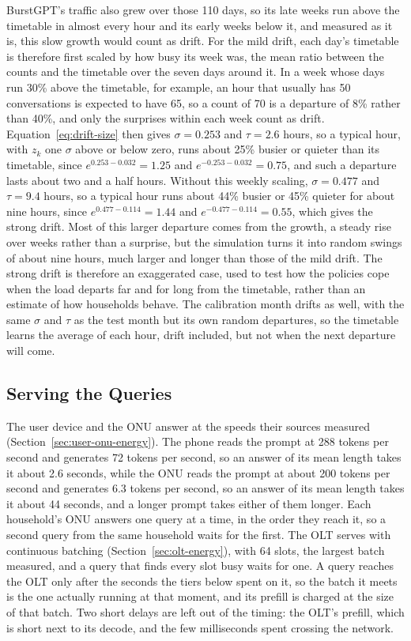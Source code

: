 \documentclass[cic,dipl,english]{infufrgs}
\begin{document}
BurstGPT's traffic also grew over those 110 days, so its late weeks run above the timetable
in almost every hour and its early weeks below it, and measured as it is, this slow growth
would count as drift. For the mild drift, each day's timetable is therefore first scaled by
how busy its week was, the mean ratio between the counts and the timetable over the seven
days around it. In a week whose days run 30\% above the timetable, for example, an hour that
usually has 50 conversations is expected to have 65, so a count of 70 is a departure of 8\%
rather than 40\%, and only the surprises within each week count as drift.
Equation~\eqref{eq:drift-size} then gives $\sigma = 0.253$ and $\tau = 2.6$ hours, so a typical hour, with $z_k$
one $\sigma$ above or below zero, runs about 25\% busier or quieter than its timetable, since
$e^{0.253 - 0.032} = 1.25$ and $e^{-0.253 - 0.032} = 0.75$, and such a departure lasts about
two and a half hours. Without this weekly scaling, $\sigma = 0.477$ and $\tau = 9.4$ hours, so a
typical hour runs about 44\% busier or 45\% quieter for about nine hours, since
$e^{0.477 - 0.114} = 1.44$ and $e^{-0.477 - 0.114} = 0.55$, which gives the strong drift. Most of this larger departure comes from the growth, a steady
rise over weeks rather than a surprise, but the simulation turns it into random swings of about
nine hours, much larger and longer than those of the mild drift. The strong drift is therefore
an exaggerated case, used to test how the policies cope when the load departs far and for long
from the timetable, rather than an estimate of how households behave. The calibration month
drifts as well, with the same $\sigma$ and $\tau$ as the test month but its own random
departures, so the timetable learns the average of each hour, drift included, but not when the
next departure will come.

\subsection{Serving the Queries}
\label{sec:serving}

The user device and the ONU answer at the speeds their sources measured
(Section~\ref{sec:user-onu-energy}). The phone reads the prompt at 288 tokens per second and
generates 72 tokens per second, so an answer of its mean length takes it about 2.6 seconds,
while the ONU reads the prompt at about 200 tokens per second and generates 6.3 tokens per
second, so an answer of its mean length takes it about 44 seconds, and a longer prompt takes
either of them longer. Each household's
ONU answers one query at a time, in the order they reach it,
so a second query from the same household waits for the first. The OLT serves with continuous
batching (Section~\ref{sec:olt-energy}), with 64 slots, the largest batch measured, and a
query that finds every slot busy waits for one. A query reaches the OLT only after the
seconds the tiers below spent on it, so the batch it meets is the one actually running
at that moment, and its prefill is charged at the size of that batch. Two short delays are
left out of the timing: the OLT's prefill, which is short next to its decode, and the few
milliseconds spent crossing the network.
\end{document}
